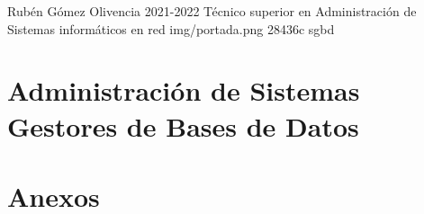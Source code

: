 \documentclass{\ClassPath/yukibook}
\begin{document}
    {Rubén Gómez Olivencia}  %
    {2021-2022}    %
    {Técnico superior en Administración de \linebreak Sistemas informáticos en red} %
    {}	%
    {}	%
    {img/portada.png} %
    {28436c}
    {sgbd} %

    \coverpage
    \graphicspath{{../../../yukibook.cls/}}
    \licensepage

    \tableofcontents

    \part{Administración de Sistemas Gestores de Bases de Datos}
    \graphicspath{{img/sgbd/}}
    

    \part{Anexos}

    \graphicspath{{../../../anexos/instalar_ubuntu_lts/img/}}
    

    \graphicspath{{../../../anexos/ubuntu_raid1/img/}}
    

    \graphicspath{{../../../anexos/gestion_backups/img/}}
    

    \graphicspath{{../../../anexos/sistemas_monitorizacion/img}}
    

    \graphicspath{{../../../anexos/monitorizacion_munin/img/}}
    

    \graphicspath{{../../../anexos/virtualbox_networking/img/}}
    
%
    \graphicspath{{../../../anexos/}}
    
\end{document}
